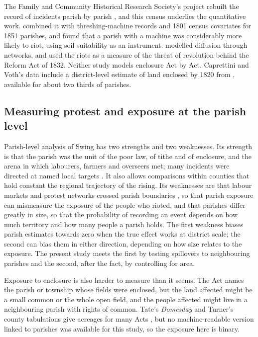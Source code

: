 \documentclass[11pt,a4paper]{article}
\begin{document}
The Family and Community Historical Research Society's project rebuilt the record of incidents parish by parish \citep{holland2005}, and this census underlies the quantitative work. \citet{caprettinivoth2020} combined it with threshing-machine records and 1801 census covariates for 1851 parishes, and found that a parish with a machine was considerably more likely to riot, using soil suitability as an instrument. \citet{aidtleon2022} modelled diffusion through networks, and \citet{aidtfranck2015} used the riots as a measure of the threat of revolution behind the Reform Act of 1832. Neither study models enclosure Act by Act. Caprettini and Voth's data include a district-level estimate of land enclosed by 1820 from \citet{gonner1912}, available for about two thirds of parishes.

\subsection{Measuring protest and exposure at the parish level}
Parish-level analysis of Swing has two strengths and two weaknesses. Its strength is that the parish was the unit of the poor law, of tithe and of enclosure, and the arena in which labourers, farmers and overseers met; many incidents were directed at named local targets \citep{hobsbawmrude1969,griffin2012}. It also allows comparisons within counties that hold constant the regional trajectory of the rising. Its weaknesses are that labour markets and protest networks crossed parish boundaries \citep{charlesworth1979,aidtleon2022}, so that parish exposure can mismeasure the exposure of the people who rioted, and that parishes differ greatly in size, so that the probability of recording an event depends on how much territory and how many people a parish holds. The first weakness biases parish estimates towards zero when the true effect works at district scale; the second can bias them in either direction, depending on how size relates to the exposure. The present study meets the first by testing spillovers to neighbouring parishes and the second, after the fact, by controlling for area.

Exposure to enclosure is also harder to measure than it seems. The Act names the parish or township whose fields were enclosed, but the land affected might be a small common or the whole open field, and the people affected might live in a neighbouring parish with rights of common. Tate's \textit{Domesday} and Turner's county tabulations give acreages for many Acts \citep{tate1978,turner1980}, but no machine-readable version linked to parishes was available for this study, so the exposure here is binary.
\end{document}
